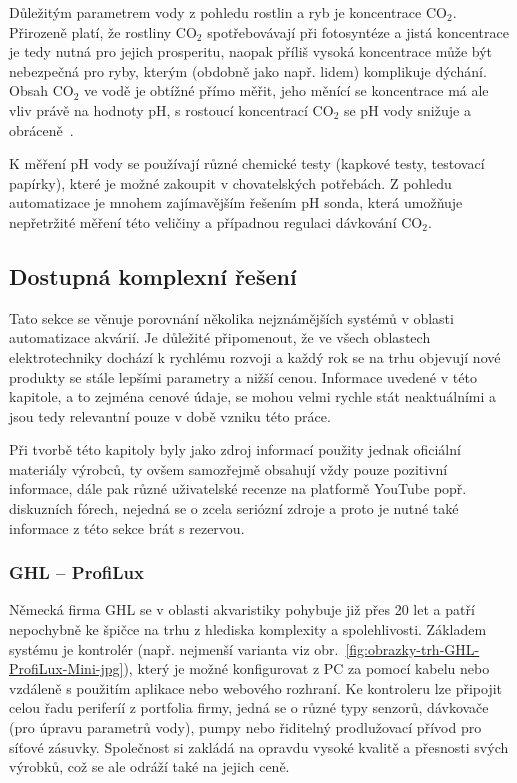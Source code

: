             Důležitým parametrem vody z pohledu rostlin a ryb je koncentrace CO\(_{2}\). Přirozeně platí, že rostliny CO\(_{2}\) spotřebovávají při fotosyntéze a jistá koncentrace je tedy nutná pro jejich prosperitu, naopak příliš vysoká koncentrace může být nebezpečná pro ryby, kterým (obdobně jako např. lidem) komplikuje dýchání. Obsah CO\(_{2}\) ve vodě je obtížné přímo měřit, jeho měnící se koncentrace má ale vliv právě na hodnoty pH, s rostoucí koncentrací CO\(_{2}\) se pH vody snižuje a obráceně~\cite{DvorakJan2014RPpa}. 

            K měření pH vody se používají různé chemické testy (kapkové testy, testovací papírky), které je možné zakoupit v chovatelských potřebách. Z pohledu automatizace je mnohem zajímavějším řešením pH sonda, která umožňuje nepřetržité měření této veličiny a případnou regulaci dávkování CO\(_{2}\).

             
    \subsection{Dostupná komplexní řešení}
    \label{lab:kapitola-komplexni-reseni}
        Tato sekce se věnuje porovnání několika nejznámějších systémů v oblasti automatizace akvárií. Je důležité připomenout, že ve všech oblastech elektrotechniky dochází k rychlému rozvoji a každý rok se na trhu objevují nové produkty se stále lepšími parametry a nižší cenou. Informace uvedené v této kapitole, a to zejména cenové údaje, se mohou velmi rychle stát neaktuálními a jsou tedy relevantní pouze v době vzniku této práce.

        Při tvorbě této kapitoly byly jako zdroj informací použity jednak oficiální materiály výrobců, ty ovšem samozřejmě obsahují vždy pouze pozitivní informace, dále pak různé uživatelské recenze na platformě YouTube popř. diskuzních fórech, nejedná se o zcela seriózní zdroje a proto je nutné také informace z této sekce brát s rezervou. 

        \subsubsection{GHL -- ProfiLux}
            Německá firma GHL se v oblasti akvaristiky pohybuje již přes 20 let a patří nepochybně ke špičce na trhu z hlediska komplexity a spolehlivosti. Základem systému je kontrolér (např. nejmenší varianta viz obr.~\ref{fig:obrazky-trh-GHL-ProfiLux-Mini-jpg}), který je možné konfigurovat z PC za pomocí kabelu nebo vzdáleně s použitím aplikace nebo webového rozhraní. Ke kontroleru lze připojit celou řadu periferíí z portfolia firmy, jedná se o různé typy senzorů, dávkovače (pro úpravu parametrů vody), pumpy nebo řiditelný prodlužovací přívod pro síťové zásuvky. Společnost si zakládá na opravdu vysoké kvalitě a přesnosti svých výrobků, což se ale odráží také na jejich ceně. 

